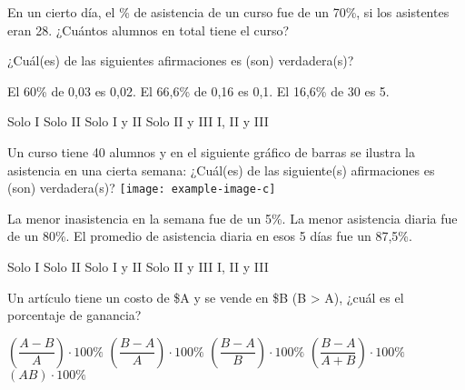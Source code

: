 \documentclass[pagina vacia]{srs}
\begin{document}
\begin{preguntas}[after-item-skip=2cm]
\pregunta En un cierto día, el \% de asistencia de un curso fue de un 70\%, si los asistentes eran 28. ¿Cuántos alumnos en total tiene el curso?
\begin{vertical}
\end{vertical}

\pregunta ¿Cuál(es) de las siguientes afirmaciones es (son) verdadera(s)?
\begin{verticali}
\alternativa El 60\% de 0,03 es 0,02.
\alternativa El 66,6\% de 0,16 es 0,1.
\alternativa El 16,6\% de 30 es 5.
\end{verticali}
\begin{vertical}
\alternativa Solo I
\alternativa Solo II
\alternativa Solo I y II
\alternativa Solo II y III
\alternativa I, II y III
\end{vertical}

\pregunta Un curso tiene 40 alumnos y en el siguiente gráfico de barras se ilustra la asistencia en una cierta semana: ¿Cuál(es) de las siguiente(s) afirmaciones es (son) verdadera(s)?
\texttt{[image: example-image-c]}
\begin{verticali}
\alternativa La menor inasistencia en la semana fue de un 5\%.
\alternativa La menor asistencia diaria fue de un 80\%.
\alternativa El promedio de asistencia diaria en esos 5 días fue un 87,5\%.
\end{verticali}
\begin{vertical}
\alternativa Solo I
\alternativa Solo II
\alternativa Solo I y II
\alternativa Solo II y III
\alternativa I, II y III
\end{vertical}


\pregunta Un artículo tiene un costo de \$A y se vende en \$B (B > A), ¿cuál es el porcentaje de ganancia?
\begin{vertical}
\alternativa \( \left( \dfrac{A - B}{A} \right) \cdot 100\% \)
\alternativa \( \left( \dfrac{B - A}{A} \right) \cdot 100\% \)
\alternativa \( \left( \dfrac{B - A}{B} \right) \cdot 100\% \)
\alternativa \( \left( \dfrac{B - A}{A + B} \right) \cdot 100\% \)
\alternativa \( (AB) \cdot 100\% \)
\end{vertical}



\end{preguntas}
\end{document}
